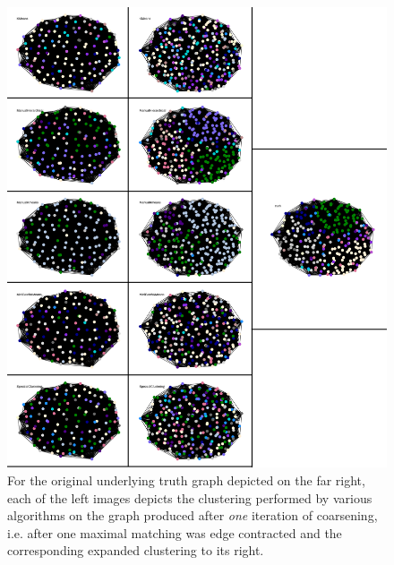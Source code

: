 \documentclass{article}
\begin{document}
\begin{figure}[H]
    \label{fig:results_contracted-1}
    \centering
    \includegraphics[width=1.0\textwidth]{results/results_contracted-1.png}
    \caption[Coarsened clustering for one iteration on $p=0.90,q=0.15$]{For the original underlying truth graph depicted on the far right, each of the left images depicts the clustering performed by various algorithms on the graph produced after \textit{one} iteration of coarsening, i.e. after one maximal matching was edge contracted and the corresponding expanded clustering to its right.}
\end{figure}
\end{document}
